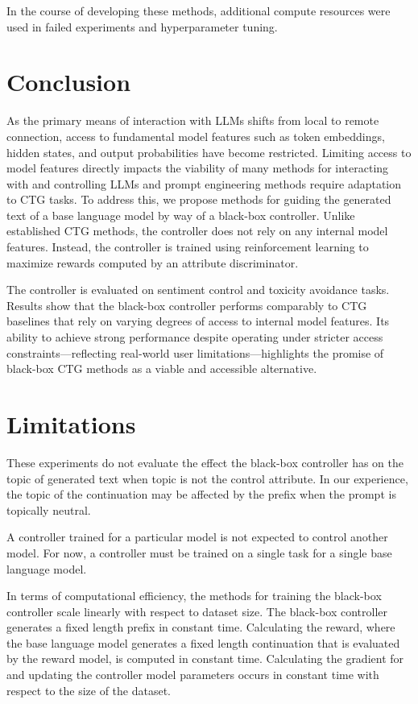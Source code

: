 \documentclass[phd,electronic,oneside,twosidetoc,letterpaper,chaptercenter,parttop,lof]{byumsphd}
\begin{document}
In the course of developing these methods, additional compute resources were used in failed experiments and hyperparameter tuning.

%
\section{Conclusion}
\label{conclusion}

As the primary means of interaction with LLMs shifts from local to remote connection, access to fundamental model features such as token embeddings, hidden states, and output probabilities have become restricted.
Limiting access to model features directly impacts the viability of many methods for interacting with and controlling LLMs and prompt engineering methods require adaptation to CTG tasks.
To address this, we propose methods for guiding the generated text of a base language model by way of a black-box controller.
Unlike established CTG methods, the controller does not rely on any internal model features.
Instead, the controller is trained using reinforcement learning to maximize rewards computed by an attribute discriminator.

The controller is evaluated on sentiment control and toxicity avoidance tasks.
Results show that the black-box controller performs comparably to CTG baselines that rely on varying degrees of access to internal model features.
Its ability to achieve strong performance despite operating under stricter access constraints—reflecting real-world user limitations—highlights the promise of black-box CTG methods as a viable and accessible alternative.

\section{Limitations}
\label{limitations}

These experiments do not evaluate the effect the black-box controller has on the topic of generated text when topic is not the control attribute.
In our experience, the topic of the continuation may be affected by the prefix when the prompt is topically neutral.

A controller trained for a particular model is not expected to control another model.
For now, a controller must be trained on a single task for a single base language model.

In terms of computational efficiency, the methods for training the black-box controller scale linearly with respect to dataset size.
The black-box controller generates a fixed length prefix in constant time.
Calculating the reward, where the base language model generates a fixed length continuation that is evaluated by the reward model, is computed in constant time.
Calculating the gradient for and updating the controller model parameters occurs in constant time with respect to the size of the dataset.
\end{document}
